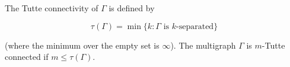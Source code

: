 The Tutte connectivity of $\Gamma$ is defined by

$$\tau(\Gamma) = \min\{k : \Gamma \text{ is } k\text{-separated}\}$$

(where the minimum over the empty set is $\infty$). The multigraph $\Gamma$ is $m$-Tutte connected if $m \leq \tau(\Gamma)$.
